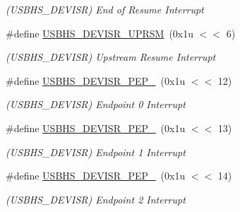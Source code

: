 \begin{DoxyCompactItemize}
\begin{DoxyCompactList}\small\item\em (U\+S\+B\+H\+S\+\_\+\+D\+E\+V\+I\+SR) End of Resume Interrupt \end{DoxyCompactList}\item 
\mbox{\label{group__SAMS70__USBHS_gaf888278280758a1d066109e9f8728b8d}} 
\#define \mbox{\hyperlink{group__SAMS70__USBHS_gaf888278280758a1d066109e9f8728b8d}{U\+S\+B\+H\+S\+\_\+\+D\+E\+V\+I\+S\+R\+\_\+\+U\+P\+R\+SM}}~(0x1u $<$$<$ 6)
\begin{DoxyCompactList}\small\item\em (U\+S\+B\+H\+S\+\_\+\+D\+E\+V\+I\+SR) Upstream Resume Interrupt \end{DoxyCompactList}\item 
\mbox{\label{group__SAMS70__USBHS_gab1c55f407682832d960812c3c497c6fe}} 
\#define \mbox{\hyperlink{group__SAMS70__USBHS_gab1c55f407682832d960812c3c497c6fe}{U\+S\+B\+H\+S\+\_\+\+D\+E\+V\+I\+S\+R\+\_\+\+P\+E\+P\+\_}}~(0x1u $<$$<$ 12)
\begin{DoxyCompactList}\small\item\em (U\+S\+B\+H\+S\+\_\+\+D\+E\+V\+I\+SR) Endpoint 0 Interrupt \end{DoxyCompactList}\item 
\mbox{\label{group__SAMS70__USBHS_ga345d60ae5fbb8b49e41a2683d10441bc}} 
\#define \mbox{\hyperlink{group__SAMS70__USBHS_ga345d60ae5fbb8b49e41a2683d10441bc}{U\+S\+B\+H\+S\+\_\+\+D\+E\+V\+I\+S\+R\+\_\+\+P\+E\+P\+\_}}~(0x1u $<$$<$ 13)
\begin{DoxyCompactList}\small\item\em (U\+S\+B\+H\+S\+\_\+\+D\+E\+V\+I\+SR) Endpoint 1 Interrupt \end{DoxyCompactList}\item 
\mbox{\label{group__SAMS70__USBHS_ga2a38367a8545f2bf724d27f571b76b51}} 
\#define \mbox{\hyperlink{group__SAMS70__USBHS_ga2a38367a8545f2bf724d27f571b76b51}{U\+S\+B\+H\+S\+\_\+\+D\+E\+V\+I\+S\+R\+\_\+\+P\+E\+P\+\_}}~(0x1u $<$$<$ 14)
\begin{DoxyCompactList}\small\item\em (U\+S\+B\+H\+S\+\_\+\+D\+E\+V\+I\+SR) Endpoint 2 Interrupt \end{DoxyCompactList}\item 

\end{DoxyCompactItemize}
